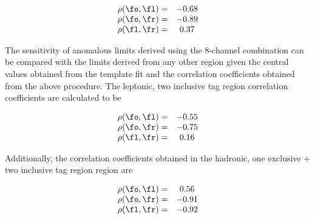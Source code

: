 \begin{equation}
   \begin{array}{cc}
   \rho(\fo,\fl) = & -0.68 \\
   \rho(\fo,\fr) = & -0.89 \\
   \rho(\fl,\fr) = &  0.37 \\
\end{array} 
\end{equation}

The sensitivity of anomalous \Wtb limits derived using the 8-channel combination can be compared with the limits derived from any other region given the central values obtained from the template fit and the correlation coefficients obtained from the above procedure. The leptonic, two inclusive \bt tag region correlation coefficients are calculated to be

\begin{equation}
   \begin{array}{cc}
   \rho(\fo,\fl) = & -0.55 \\
   \rho(\fo,\fr) = & -0.75 \\
   \rho(\fl,\fr) = &  0.16 \\
\end{array} 
\end{equation}

Additionally, the correlation coefficients obtained in the hadronic, one exclusive + two inclusive \bt tag region region are 

\begin{equation}
   \begin{array}{cc}
   \rho(\fo,\fl) = &  0.56 \\
   \rho(\fo,\fr) = & -0.91 \\
   \rho(\fl,\fr) = & -0.92 \\
\end{array} 
\end{equation}


